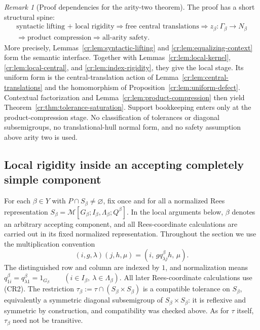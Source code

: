 \documentclass[10pt,a4paper]{article}
\theoremstyle{definition}
\theoremstyle{remark}
\newtheorem{remark}[theorem]{Remark}
\begin{document}
\begin{remark}[Proof dependencies for the arity-two theorem]
\label{cr:rem:dependencies}
The proof has a short structural spine:
\[
\begin{gathered}
\text{syntactic lifting + local rigidity}
\Longrightarrow
\text{free central translations}
\Longrightarrow
z_\beta:\Gamma_\beta\to N_\beta
\\[-1pt]
\Longrightarrow
\text{product compression}
\Longrightarrow
\text{all-arity safety}.
\end{gathered}
\]
More precisely, Lemmas~\ref{cr:lem:syntactic-lifting} and
\ref{cr:lem:equalizing-context} form the semantic interface.  Together with
Lemmas~\ref{cr:lem:local-kernel}, \ref{cr:lem:local-central}, and
\ref{cr:lem:index-rigidity}, they give the local stage.  Its uniform form is
the central-translation action of Lemma~\ref{cr:lem:central-translations}
and the homomorphism of Proposition~\ref{cr:lem:uniform-defect}.  Contextual
factorization and Lemma~\ref{cr:lem:product-compression} then yield
Theorem~\ref{cr:thm:tolerance-saturation}.  Support bookkeeping enters only
at the product-compression stage.  No classification of tolerances or
diagonal subsemigroups, no translational-hull normal form, and no safety
assumption above arity two is used.
\end{remark}

\subsection{Local rigidity inside an accepting completely simple component}

For each \(\beta\in Y\) with \(P\cap S_\beta\ne\varnothing\), fix once and
for all a normalized Rees representation
\(S_\beta=\mathcal M[G_\beta;I_\beta,\Lambda_\beta;Q^\beta].\)
In the local arguments below, \(\beta\) denotes an arbitrary accepting
component, and all Rees-coordinate calculations are carried out in its fixed
normalized representation.
Throughout the section we use the multiplication convention
\[
(i,g,\lambda)(j,h,\mu)
=
(i,\,gq^\beta_{\lambda j}h,\,\mu).
\tag{CR2}
\]
The distinguished row and column are indexed by $1$, and normalization means
\(
q^\beta_{1i}=q^\beta_{\lambda 1}=1_{G_\beta}
\qquad(i\in I_\beta,\ \lambda\in\Lambda_\beta).
\)
All later Rees-coordinate calculations use \textup{(CR2)}.
The restriction
\(\tau_\beta:=\tau\cap(S_\beta\times S_\beta)\)
is a compatible tolerance on $S_\beta$, equivalently a symmetric diagonal
subsemigroup of $S_\beta\times S_\beta$: it is reflexive and symmetric by
construction, and compatibility was checked above.  As for $\tau$ itself,
$\tau_\beta$ need not be transitive.
\end{document}
